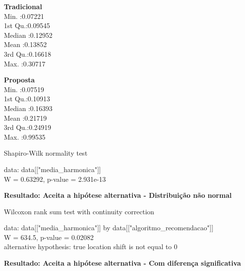 \begin{multicols}{2}

\noindent\textbf{Tradicional}\\
Min.   :0.07221\\
1st Qu.:0.09545\\
Median :0.12952\\
Mean   :0.13852\\
3rd Qu.:0.16618\\
Max.   :0.30717\\

\columnbreak

\noindent\textbf{Proposta}\\
Min.   :0.07519\\
1st Qu.:0.10913\\
Median :0.16393\\
Mean   :0.21719\\
3rd Qu.:0.24919\\
Max.   :0.99535
\end{multicols}

Shapiro-Wilk normality test

\noindent
data:  data[["media\_harmonica"]]\\
W = 0.63292, p-value = 2.931e-13

\textbf{Resultado: Aceita a hipótese alternativa - Distribuição não normal}

Wilcoxon rank sum test with continuity correction

\noindent
data:  data[["media\_harmonica"]] by data[["algoritmo\_recomendacao"]]\\
W = 634.5, p-value = 0.02082\\
alternative hypothesis: true location shift is not equal to 0

\textbf{Resultado: Aceita a hipótese alternativa - Com diferença significativa}
